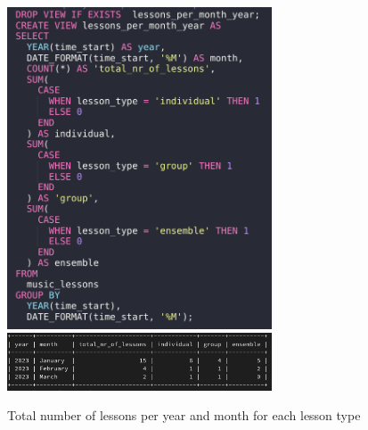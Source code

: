 \documentclass[a4paper]{scrreprt}
\begin{document}
\begin{figure}[h]
    \begin{center}
        \includegraphics[width=0.70\textwidth]{../img/lessonsSQL.png} \\
        \includegraphics[width=0.70\textwidth]{../img/lessons.png}
        \caption{Total number of lessons per year and month for each lesson type}
        \label{fig:lessons}
    \end{center}
\end{figure}
\end{document}
